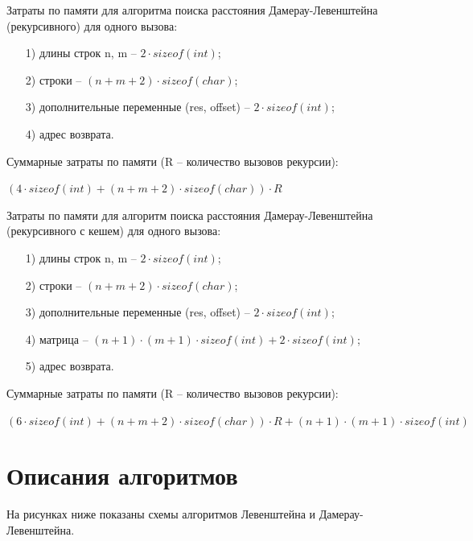 \documentclass[12pt]{report}
\begin{document}
	Затраты по памяти для алгоритма поиска расстояния Дамерау-Левенштейна (рекурсивного) для одного вызова:
	
	\begin{enumerate}
	\item[1)] длины строк n, m -- $2 \cdot sizeof(int)$;
	\item[2)] строки -- $(n + m + 2) \cdot sizeof(char)$;
	\item[3)] дополнительные переменные (res, offset) -- $2 \cdot sizeof(int)$; 
	\item[4)] адрес возврата.
	\end{enumerate}
	
	Суммарные затраты по памяти (R -- количество вызовов рекурсии):
	
	$(4 \cdot sizeof(int) + (n + m + 2) \cdot sizeof(char)) \cdot R$\newline
	
	Затраты по памяти для алгоритм поиска расстояния Дамерау-Левенштейна (рекурсивного с кешем) для одного вызова:
	
	\begin{enumerate}
	\item[1)] длины строк n, m -- $2 \cdot sizeof(int)$;
	\item[2)] строки -- $(n + m + 2) \cdot sizeof(char)$;
	\item[3)] дополнительные переменные (res, offset) -- $2 \cdot sizeof(int)$; 
	\item[4)] матрица -- $(n + 1) \cdot (m + 1) \cdot sizeof(int) + 2 \cdot sizeof(int)$;
	\item[5)] адрес возврата.
	\end{enumerate}
	
	Суммарные затраты по памяти (R -- количество вызовов рекурсии):
	
	$(6 \cdot sizeof(int) + (n + m + 2) \cdot sizeof(char)) \cdot R + (n + 1) \cdot (m + 1) \cdot sizeof(int)$\newline
	
	\section{Описания алгоритмов}
	
	На рисунках ниже показаны схемы алгоритмов Левенштейна и Дамерау-Левенштейна.
	
\end{document}
